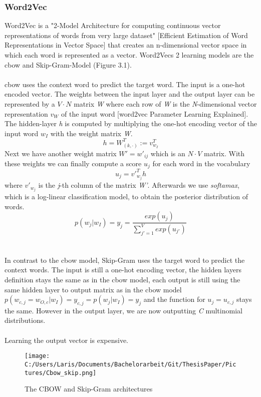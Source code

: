 \documentclass[a4paper, 11pt,titlepage,oneside,openany]{book}
\begin{document}
\subsubsection{Word2Vec}
Word2Vec is a "2-Model Architecture for computing continuous vector representations of words from very large dataset" [Efficient Estimation of Word Representations in Vector Space] that creates an n-dimensional vector space in which each word is represented as a vector. Word2Vecs 2 learning models are the \gls{cbow} and Skip-Gram-Model (Figure 3.1).\\
\\
\noindent \gls{cbow} uses the context word to predict the target word. The input is a one-hot encoded vector. The weights between the input layer and the output layer can be represented by a $V \cdot N$ matrix \textit{W} where each row of \textit{W} is the \textit{N}-dimensional vector representation $v_W$ of the input word [word2vec Parameter Learning Explained]. The hidden-layer \textit{h} is computed by multiplying the one-hot encoding vector of the input word $w_I$ with the weight matrix \textit{W}.
\[
	h=W_{(k, \cdot)}^{T}:=v_{w_I}^{T}
\] 
Next we have another weight matrix $W'={w'_{ij}}$ which is an $N \cdot V$ matrix. With these weights we can finally compute a score $u_j$ for each word in the vocabulary
\[
	u_{j}={v'}_{w_j}^{T}h
\] where ${v'}_{w_j}$ is the \textit{j}-th column of the matrix \textit{W'}. Afterwards we use \textit{softamax}, which is a log-linear classification model, to obtain the posterior distribution of words.
\[
	p(w_j|w_I)=y_j=\frac{exp(u_j)}{\sum_{j'=1}^V exp(u_{j'})}
\] \\
\\
\noindent In contrast to the \gls{cbow} model,  Skip-Gram uses the target word to predict the context words. The input is still a one-hot encoding vector, the hidden layers definition stays the same as in the \gls{cbow} model, each output is still using the same hidden layer to output matrix as in the \gls{cbow} model $p(w_{c,j}=w_{O,c}|w_I)=y_{c,j} = p(w_j|w_I)=y_j$ and the function for $u_j=u_{c,j}$ stays the same. However in the output layer, we are now outputting \textit{C} multinomial distributions. \\
\\
\noindent Learning the output vector is expensive.
\begin{figure}[t]
	\centering
	\texttt{[image: C:/Users/Laris/Documents/Bachelorarbeit/Git/ThesisPaper/Pictures/Cbow\_skip.png]}
		\caption{The CBOW and Skip-Gram architectures}
	\label{fig:CBOW and Skip-Gram architectures}
\end{figure}
\end{document}
